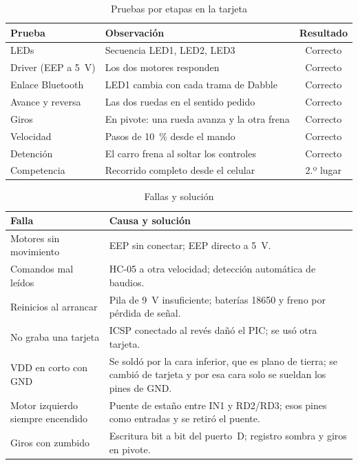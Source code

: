 \documentclass[conference,letterpaper]{IEEEtran}
\begin{document}
\begin{table}[!t]
  \caption{Pruebas por etapas en la tarjeta}
  \label{t:res}
  \centering
  \footnotesize
  \begin{tabularx}{\columnwidth}{@{}l L c@{}}
    \toprule
    \textbf{Prueba} & \textbf{Observación} & \textbf{Resultado} \\
    \midrule
    LEDs & Secuencia LED1, LED2, LED3 & Correcto \\
    Driver (EEP a \SI{5}{\volt}) & Los dos motores responden & Correcto \\
    Enlace Bluetooth & LED1 cambia con cada trama de Dabble & Correcto \\
    Avance y reversa & Las dos ruedas en el sentido pedido & Correcto \\
    Giros & En pivote: una rueda avanza y la otra frena & Correcto \\
    Velocidad & Pasos de \SI{10}{\percent} desde el mando & Correcto \\
    Detención & El carro frena al soltar los controles & Correcto \\
    Competencia & Recorrido completo desde el celular & 2.º lugar \\
    \bottomrule
  \end{tabularx}
\end{table}

\begin{table}[!t]
  \caption{Fallas y solución}
  \label{t:prob}
  \centering
  \footnotesize
  \begin{tabularx}{\columnwidth}{@{}>{\raggedright\arraybackslash}p{2.6cm} L@{}}
    \toprule
    \textbf{Falla} & \textbf{Causa y solución} \\
    \midrule
    Motores sin movimiento & EEP sin conectar; EEP directo a \SI{5}{\volt}. \\
    Comandos mal leídos & HC-05 a otra velocidad; detección automática de baudios. \\
    Reinicios al arrancar & Pila de \SI{9}{\volt} insuficiente; baterías 18650 y freno por pérdida de señal. \\
    No graba una tarjeta & ICSP conectado al revés dañó el PIC; se usó otra tarjeta. \\
    VDD en corto con GND & Se soldó por la cara inferior, que es plano de tierra; se cambió de tarjeta y por esa cara solo se sueldan los pines de GND. \\
    Motor izquierdo siempre encendido & Puente de estaño entre IN1 y RD2/RD3; esos pines como entradas y se retiró el puente. \\
    Giros con zumbido & Escritura bit a bit del puerto~D; registro sombra y giros en pivote. \\
    \bottomrule
  \end{tabularx}
\end{table}
\end{document}
